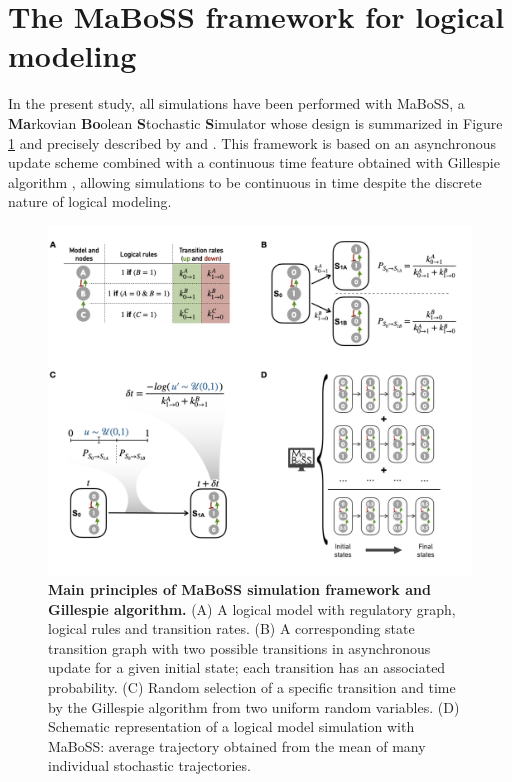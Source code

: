 \documentclass[a4paper,12pt,twoside,onecolumn,openright,final,oldfontcommands]{memoir}
\begin{document}
\section{The MaBoSS framework for logical
modeling}\label{maboss-section}

In the present study, all simulations have been performed with MaBoSS, a
\textbf{Ma}rkovian \textbf{Bo}olean \textbf{S}tochastic
\textbf{S}imulator whose design is summarized in Figure \ref{fig:maboss}
and precisely described by \citet{stoll2012continuous} and
\citet{stoll2017maboss}. This framework is based on an asynchronous
update scheme combined with a continuous time feature obtained with
Gillespie algorithm \citep{gillespie1976general}, allowing simulations
to be continuous in time despite the discrete nature of logical
modeling.

\begin{figure}

{\centering \includegraphics[width=1\linewidth]{fig/maboss} 

}

\caption[Main principles of MaBoSS simulation framework and Gillespie algorithm]{\textbf{Main principles of MaBoSS simulation
framework and Gillespie algorithm.} (A) A logical model with regulatory
graph, logical rules and transition rates. (B) A corresponding state
transition graph with two possible transitions in asynchronous update
for a given initial state; each transition has an associated
probability. (C) Random selection of a specific transition and time by
the Gillespie algorithm from two uniform random variables. (D) Schematic
representation of a logical model simulation with MaBoSS: average
trajectory obtained from the mean of many individual stochastic
trajectories.}\label{fig:maboss}
\end{figure}
\end{document}
